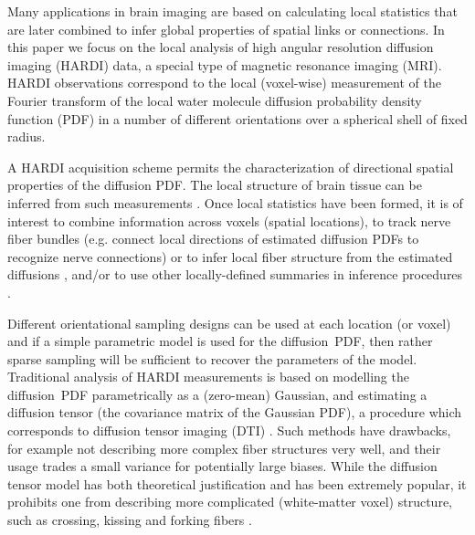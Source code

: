 \documentclass[dvips,aoas,preprint]{imsart}
\numberwithin{equation}{section}
\theoremstyle{plain}
\begin{document}
Many applications in brain imaging are based on calculating local
statistics that are later combined to infer global properties of
spatial links or connections. In this paper we focus on the local
analysis of high angular resolution diffusion imaging (HARDI) data, a
special type of magnetic resonance imaging (MRI).  HARDI observations
correspond to the local (voxel-wise) measurement of the Fourier
transform of the local water molecule diffusion probability density
function (PDF) \citep{Callaghan} in a number of different orientations
over a spherical shell of fixed radius.

A HARDI acquisition scheme permits the characterization of directional
spatial properties of the diffusion PDF.  The local structure of brain
tissue can be inferred from such measurements
\cite{basser1994,bas:relationships}.  Once local statistics have been
formed, it is of interest to combine information across voxels
(spatial locations), to track nerve fiber bundles (e.g. connect local
directions of estimated diffusion PDFs to recognize nerve connections)
or to infer local fiber structure from the estimated diffusions
\citep{mor-zij:fiber-tracking}, and/or to use other locally-defined
summaries in inference procedures \citep{jen-etal:kurtosis}.

Different orientational sampling designs can be used at each location
(or voxel) and if a simple parametric model is used for the
diffusion~PDF, then rather sparse sampling will be sufficient to
recover the parameters of the model.  Traditional analysis of HARDI
measurements is based on modelling the diffusion~PDF parametrically as
a (zero-mean) Gaussian, and estimating a diffusion tensor (the
covariance matrix of the Gaussian PDF), a procedure which corresponds
to diffusion tensor imaging (DTI) \citep{basser1994}.  Such methods
have drawbacks, for example not describing more complex fiber
structures very well, and their usage trades a small variance for
potentially large biases.  While the diffusion tensor model has both
theoretical justification and has been extremely popular, it prohibits
one from describing more complicated (white-matter voxel) structure,
such as crossing, kissing and forking fibers
\citep{mor-zij:fiber-tracking}.
\end{document}
